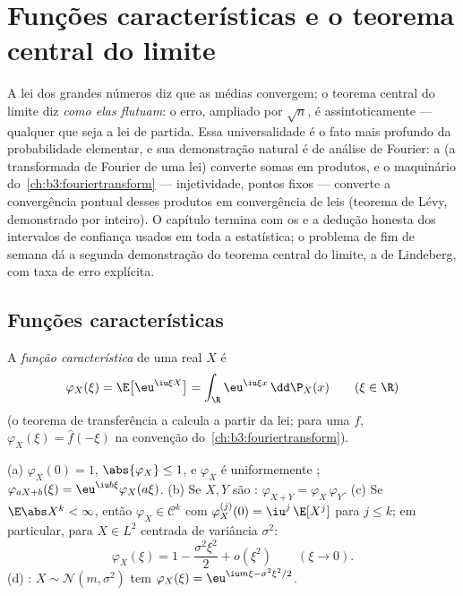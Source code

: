 \chapter{Funções características e o teorema central do
limite}\label{ch:b3:clt}

A lei dos grandes números diz que as médias convergem; o teorema central
do limite diz \emph{como elas flutuam}: o erro, ampliado por $\sqrt n$, é
assintoticamente  --- qualquer que seja a lei de partida. Essa
universalidade é o fato mais profundo da probabilidade elementar, e sua
demonstração natural é de análise de Fourier: a \emph{} (a transformada de Fourier de uma lei) converte somas
 em produtos, e o maquinário do~\cref{ch:b3:fouriertransform} ---
injetividade, pontos fixos  --- converte a convergência
pontual desses produtos em convergência de leis (teorema de Lévy,
demonstrado por inteiro). O capítulo termina com os  e
a dedução honesta dos intervalos de confiança usados em toda a
estatística; o problema de fim de semana dá a segunda demonstração do
teorema central do limite, a de Lindeberg, com taxa de erro explícita.

\section{Funções características}

\begin{definition}\label{def:b3:clt:cf}
A \emph{função característica} de uma
 real $X$ é
\[
\varphi_X(\xi) = \E\bigl[\eu^{\iu\xi X}\bigr]
= \int_\R \eu^{\iu\xi x}\,\dd\P_X(x)
\qquad (\xi \in \R)
\]
(o teorema de transferência a calcula a partir da lei; para uma
 $f$, $\varphi_X(\xi) = \hat f(-\xi)$ na convenção do~\cref{ch:b3:fouriertransform}).
\end{definition}

\begin{proposition}\label{prop:b3:clt:cfbasics}
(a) $\varphi_X(0) = 1$, $\abs{\varphi_X} \leq 1$, e $\varphi_X$ é uniformemente ; $\varphi_{aX + b}(\xi) = \eu^{\iu b\xi}\varphi_X(a\xi)$.
(b) Se $X, Y$ são \emph{}: $\varphi_{X+Y} = \varphi_X\,\varphi_Y$.
(c) Se $\E\abs X^k < \infty$, então $\varphi_X \in \mathcal
C^k$ com $\varphi_X^{(j)}(0) = \iu^j\,\E[X^j]$ para $j \leq
k$; em particular, para $X \in L^2$
centrada de variância $\sigma^2$:
\[
\varphi_X(\xi) = 1 - \frac{\sigma^2\xi^2}{2} +
o(\xi^2) \qquad (\xi \to 0).
\]
(d) : $X \sim \mathcal N(m, \sigma^2)$ tem $\varphi_X(\xi) = \eu^{\iu m\xi - \sigma^2\xi^2/2}$.
\end{proposition}

